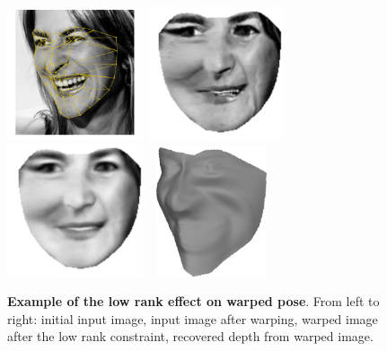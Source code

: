 \begin{figure}
    \centering
    \includegraphics[width=4cm]{collection_ps/images/example_warped_original}
    \includegraphics[width=4cm]{collection_ps/images/example_warped}
    \includegraphics[width=4cm]{collection_ps/images/example_warped_low_rank}
    \includegraphics[width=3.8cm,height=3.8cm,trim = 0cm -1cm 0cm 0cm]{collection_ps/images/example_warped_shape}
    \caption{{\bf Example of the low rank effect on warped pose}. From left to
             right: initial input image, input image after warping,
             warped image after the low rank constraint, 
             recovered depth from warped image.}
\label{fig:imag_coll_low_rank_warping}
\end{figure}

